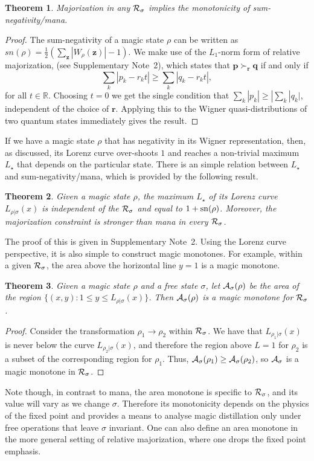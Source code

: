 \documentclass[
onecolumn,
superscriptaddress
]{revtex4-1}
\newtheorem{theorem}{Theorem}
\def\z{\boldsymbol{z}}
\def\r{\boldsymbol{r}}
\def\p{\boldsymbol{p}}
\def\q{\boldsymbol{q}}
\def\q{\boldsymbol{q}}
\def\A{{\cal A}}
\def\R{{\cal R}}
\begin{document}
\begin{theorem} Majorization in any $\R_\sigma$ implies the monotonicity of sum-negativity/mana. 
\end{theorem}
\begin{proof}
	The sum-negativity of a magic state $\rho$ can be written as $sn(\rho) =\frac{1}{2} (\sum_{\z} |W_\rho(\z) | - 1)$.
We make use of the $L_1$-norm form of relative majorization, (see Supplementary Note~2), which states that $\p \succ_{\r} \q$ if and only if
	\begin{equation}
\sum_k | p_k - r_k t | \geq \sum_k | q_k - r_k t |,
\end{equation}
for all $t\in \mathbb{R}$. Choosing $t=0$ we get the single condition that $\sum_k |p_k| \ge |\sum_k |q_k|$, independent of the choice of $\r$. Applying this to the Wigner quasi-distributions of two quantum states immediately gives the result.
\end{proof}

If we have a magic state $\rho$ that has negativity in its Wigner representation, then, as discussed, its Lorenz curve over-shoots $1$ and reaches a non-trivial maximum $L_\star$ that depends on the particular state. There is an simple relation between $L_\star$ and sum-negativity/mana, which is provided by the following result. 
\begin{theorem}\label{lem:lcmax}
	Given a magic state $\rho$, the maximum $L_\star$ of its Lorenz curve $L_{\rho|\sigma}(x)$ is independent of the $\R_\sigma$ and equal to $1+{\rm sn}(\rho)$. Moreover, the majorization constraint is stronger than mana in every $\R_\sigma$.
\end{theorem}
The proof of this is given in Supplementary Note~2. Using the Lorenz curve perspective, it is also simple to construct magic monotones. For example, within a given $\R_\sigma$, the area above the horizontal line $y = 1$ is a magic monotone.
\begin{theorem}
Given a magic state $\rho$ and a free state $\sigma$, let $\A_\sigma(\rho)$ be the area of the region $\{(x, y): 1 \leq y \leq L_{\rho | \sigma}(x)\}$. Then $\A_\sigma(\rho)$ is a magic monotone for $\R_\sigma$.
\end{theorem}
\begin{proof}
Consider the transformation $\rho_1 \rightarrow \rho_2$ within $\R_\sigma$. We have that $L_{\rho_1|\sigma}(x)$ is never below the curve $L_{\rho_2|\sigma}(x)$, and therefore the region above $L=1$ for $\rho_2$ is a subset of the corresponding region for $\rho_1$. Thus, $\A_\sigma(\rho_1) \geq \A_\sigma(\rho_2)$, so $\A_\sigma$ is a magic monotone in $\R_\sigma$.
\end{proof}
Note though, in contrast to mana, the area monotone is specific to $\R_\sigma$, and its value will vary as we change $\sigma$. Therefore its monotonicity depends on the physics of the fixed point and provides a means to analyse magic distillation only under free operations that leave $\sigma$ invariant. One can also define an area monotone in the more general setting of relative majorization, where one drops the fixed point emphasis.
\end{document}
